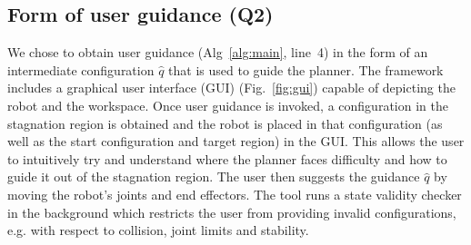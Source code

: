 \documentclass{article}
\begin{document}


%
%


\subsection{Form of user guidance (Q2)}
\label{sec:q2}
We chose to obtain user guidance 
(Alg~\ref{alg:main}, line~4)
in the form of an intermediate configuration $\hat{q}$ that is used to guide the planner. 
%
The framework includes a graphical user interface (GUI) (Fig.~\ref{fig:gui}) capable of  depicting the robot and the workspace.
Once user guidance is invoked, 
a configuration in the stagnation region is obtained and the robot is placed in that configuration (as well as the start configuration and target region) in the GUI.
This allows the user to intuitively try and understand where the planner faces difficulty and how to guide it out of the stagnation region.
The user then suggests the guidance $\hat{q}$ by moving the robot's joints and end effectors.
The tool runs a state validity checker in the background which restricts the user from providing invalid configurations, e.g. with respect to collision, joint limits and stability.
\end{document}
